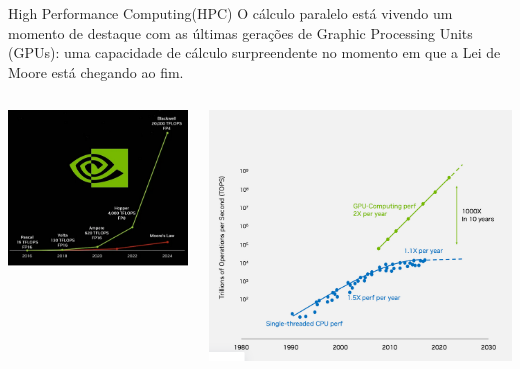 \documentclass{beamer}
\begin{document}
	\begin{frame}{High Performance Computing(HPC)}
		\scriptsize
		O cálculo paralelo está vivendo um momento de destaque com as últimas gerações de Graphic Processing Units (GPUs): uma capacidade de cálculo surpreendente no momento em que a Lei de Moore está chegando ao fim.
		
		\vspace{0.3cm}
		
		\begin{columns}[T] 
			\includegraphics[scale=0.2]{Nvidia.png}
			
			\includegraphics[scale=0.14]{Moore_vs_GPU.png}
		\end{columns}
		

\end{frame}
\end{document}

